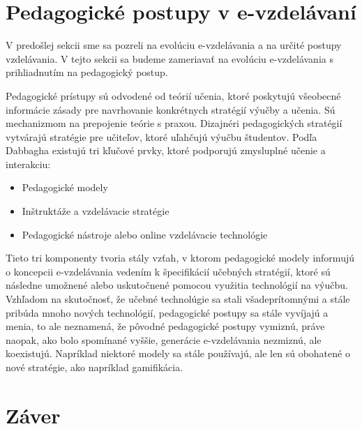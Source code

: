 \documentclass[10pt,slovak,a4paper]{article}
\begin{document}
\section{Pedagogické postupy v e-vzdelávaní} \label{pedagogicalApproaches}
	V predošlej sekcii sme sa pozreli na evolúciu e-vzdelávania a na určité postupy vzdelávania. V tejto sekcii sa budeme zameriavať na evolúciu e-vzdelávania s prihliadnutím na pedagogický postup.

	Pedagogické prístupy sú odvodené od teórií učenia, ktoré poskytujú všeobecné informácie
zásady pre navrhovanie konkrétnych stratégií výučby a učenia. Sú mechanizmom na prepojenie teórie s praxou. Dizajnéri pedagogických stratégií vytvárajú stratégie pre učiteľov, ktoré uľahčujú výučbu študentov. Podľa Dabbagha existujú tri kľučové prvky, ktoré podporujú zmysluplné učenie a interakciu:
	\begin{itemize}
		\item Pedagogické modely
		\item Inštruktáže a vzdelávacie stratégie
		\item Pedagogické nástroje alebo online vzdelávacie technológie
	\end{itemize}
	Tieto tri komponenty tvoria stály vzťah, v ktorom pedagogické modely informujú o koncepcii e-vzdelávania vedením k špecifikácií učebných stratégií, ktoré sú následne umožnené alebo uskutočnené pomocou využitia technológií na výučbu. Vzhľadom na skutočnosť, že učebné technolúgie sa stali všadeprítomnými a stále pribúda mnoho nových technológií, pedagogické postupy sa stále vyvíjajú a menia, to ale neznamená, že pôvodné pedagogické postupy vymiznú, práve naopak, ako bolo spomínané vyššie, generácie e-vzdelávania nezmiznú, ale koexistujú. Napríklad niektoré modely sa stále používajú, ale len sú obohatené o nové stratégie, ako napríklad gamifikácia. 




\section{Záver} \label{zaver} 
\newpage

\end{document}
